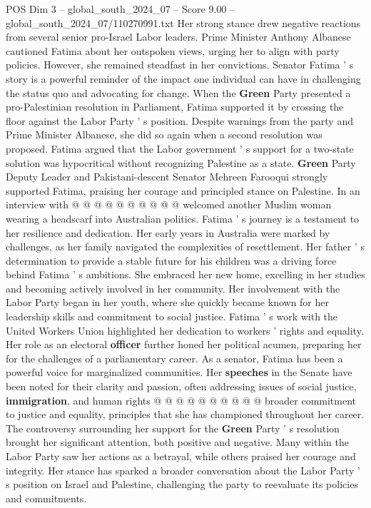 \begin{textsample}{POS Dim 3 – global\_south\_2024\_07 – Score 9.00 – global\_south\_2024\_07/110270991.txt}
Her strong stance drew negative reactions from several senior pro-Israel Labor leaders.
Prime Minister Anthony Albanese cautioned Fatima about her outspoken views, urging her to align with party policies.
However, she remained steadfast in her convictions.
Senator Fatima ' s story is a powerful reminder of the impact one individual can have in challenging the status quo and advocating for change.
When the \textbf{Green} Party presented a pro-Palestinian resolution in Parliament, Fatima supported it by crossing the floor against the Labor Party ' s position.
Despite warnings from the party and Prime Minister Albanese, she did so again when a second resolution was proposed.
Fatima argued that the Labor government ' s support for a two-state solution was hypocritical without recognizing Palestine as a state. \textbf{Green} Party Deputy Leader and Pakistani-descent Senator Mehreen Farooqui strongly supported Fatima, praising her courage and principled stance on Palestine.
In an interview with @ @ @ @ @ @ @ @ @ @ welcomed another Muslim woman wearing a headscarf into Australian politics.
Fatima ' s journey is a testament to her resilience and dedication.
Her early years in Australia were marked by challenges, as her family navigated the complexities of resettlement.
Her father ' s determination to provide a stable future for his children was a driving force behind Fatima ' s ambitions.
She embraced her new home, excelling in her studies and becoming actively involved in her community.
Her involvement with the Labor Party began in her youth, where she quickly became known for her leadership skills and commitment to social justice.
Fatima ' s work with the United Workers Union highlighted her dedication to workers ' rights and equality.
Her role as an electoral \textbf{officer} further honed her political acumen, preparing her for the challenges of a parliamentary career.
As a senator, Fatima has been a powerful voice for marginalized communities.
Her \textbf{speeches} in the Senate have been noted for their clarity and passion, often addressing issues of social justice, \textbf{immigration}, and human rights @ @ @ @ @ @ @ @ @ @ broader commitment to justice and equality, principles that she has championed throughout her career.
The controversy surrounding her support for the \textbf{Green} Party ' s resolution brought her significant attention, both positive and negative.
Many within the Labor Party saw her actions as a betrayal, while others praised her courage and integrity.
Her stance has sparked a broader conversation about the Labor Party ' s position on Israel and Palestine, challenging the party to reevaluate its policies and commitments.

\end{textsample}
